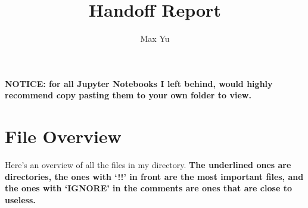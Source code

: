 \documentclass[12pt]{article}
\theoremstyle{definition}
\begin{document}
 
\title{Handoff Report}
\author{Max Yu}
\date{}
\maketitle

\textbf{NOTICE: for all Jupyter Notebooks I left behind, would highly recommend copy pasting them to your own folder to view.}

\tableofcontents

\newpage

\section{File Overview}

Here's an overview of all the files in my directory. \textbf{The underlined ones are directories, the ones with `!!' in front are the most important files, and the ones with `IGNORE' in the comments are ones that are close to useless.}
\end{document}
